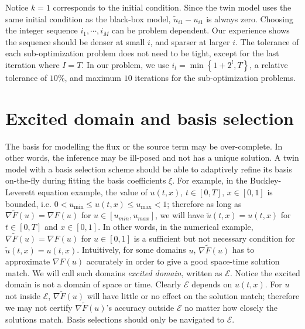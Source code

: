 \documentclass[a4paper,onecolumn]{article}
\theoremstyle{remark}
\begin{document}
\noindent Notice $k=1$ corresponds to the initial condition. Since the twin model
uses the same initial condition as the black-box model, $\tilde{u}_{i1} - u_{i1}$
is always zero.
Choosing the integer sequence $i_1,\cdots,i_M$ can be problem dependent.
Our experience shows the sequence should be denser at small $i$, and sparser at larger $i$.
The tolerance of each sub-optimization problem does not need to be tight,
except for the last iteration where $I=T$.
In our problem, we use $i_l = \min\left\{ 1+2^l, T\right\}$,
a relative tolerance of $10\%$, and maximum $10$ iterations for the sub-optimization problems.\\

\section{Excited domain and basis selection}
\label{adaptive}
The basis for modelling the flux or the source term may be over-complete.
In other words, the inference may be ill-posed and not has a unique solution.
A twin model with a basis selection scheme should be able to adaptively
refine its basis on-the-fly during fitting the basis coefficients $\xi$.
For example, in the Buckley-Leverett equation example,
the value of $u(t,x)$, $t\in[0,T],\,x\in[0,1]$ is bounded, i.e.
$0< u_{\min}\le u(t,x)\le u_{\max} < 1$; therefore as long as 
$\nabla\tilde{F}(u) = \nabla F(u)$ for $u\in[u_{min},u_{max}]$, we will have
$\tilde{u}(t,x) = u(t,x)$ for $t\in[0,T]$ and $x\in[0,1]$.
In other words, in the numerical example, $\nabla \tilde{F}(u) = \nabla F(u)$ for $u\in [0,1]$
is a sufficient but not necessary condition
for $\tilde{u}(t,x) = u(t,x)$. 
Intuitively, for some domains $u$, $\nabla \tilde{F}(u)$ has to approximate $\nabla F(u)$
accurately in order to give a good space-time solution match.
We will call such domains \emph{excited domain}, written as $\mathcal{E}$. 
Notice the excited domain is not a domain of space or time.  
Clearly $\mathcal{E}$ depends on $u(t,x)$.
For $u$ not inside $\mathcal{E}$,
$\nabla \tilde{F}(u)$ will have little or no effect on the solution match; therefore
we may not certify $\nabla \tilde{F}(u)$'s accuracy outside $\mathcal{E}$
no matter how closely the solutions match.
Basis selections should only be navigated to $\mathcal{E}$.\\
\end{document}
